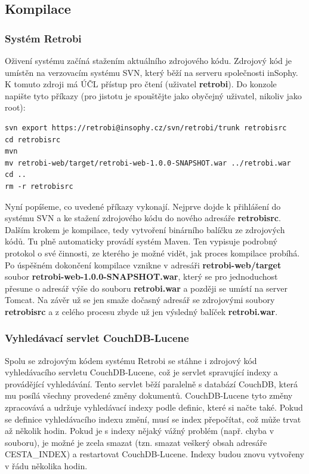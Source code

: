 \subsection{Kompilace}

\subsubsection{Systém Retrobi}

Oživení systému začíná stažením aktuálního zdrojového kódu. Zdrojový kód je umístěn na verzovacím systému SVN, který běží na serveru společnosti inSophy. K tomuto zdroji má ÚČL přístup pro čtení (uživatel {\bf retrobi}).  Do konzole napište tyto příkazy (pro jistotu je spouštějte jako obyčejný uživatel, nikoliv jako root):

\begin{verbatim}
svn export https://retrobi@insophy.cz/svn/retrobi/trunk retrobisrc
cd retrobisrc
mvn
mv retrobi-web/target/retrobi-web-1.0.0-SNAPSHOT.war ../retrobi.war
cd ..
rm -r retrobisrc
\end{verbatim}

Nyní popíšeme, co uvedené příkazy vykonají. Nejprve dojde k přihlášení do systému SVN a ke stažení zdrojového kódu do nového adresáře {\bf retrobisrc}. Dalším krokem je kompilace, tedy vytvoření binárního balíčku ze zdrojových kódů. Tu plně automaticky provádí systém Maven. Ten vypisuje podrobný protokol o své činnosti, ze kterého je možné vidět, jak proces kompilace probíhá. Po úspěšném dokončení kompilace vznikne v adresáři {\bf retrobi-web/target} soubor {\bf retrobi-web-1.0.0-SNAPSHOT.war}, který se pro jednoduchost přesune o adresář výše do souboru {\bf retrobi.war} a později se umístí na server Tomcat. Na závěr už se jen smaže dočasný adresář se zdrojovými soubory {\bf retrobisrc} a z celého procesu zbyde už jen výsledný balíček {\bf retrobi.war}.

\subsubsection{Vyhledávací servlet CouchDB-Lucene}

Spolu se zdrojovým kódem systému Retrobi se stáhne i zdrojový kód vyhledávacího servletu CouchDB-Lucene, což je servlet spravující indexy a provádějící vyhledávání. Tento servlet běží paralelně s databází CouchDB, která mu posílá všechny provedené změny dokumentů. CouchDB-Lucene tyto změny zpracovává a udržuje vyhledávací indexy podle definic, které si načte také. Pokud se definice vyhledávacího indexu změní, musí se index přepočítat, což může trvat až několik hodin. Pokud je s indexy nějaký vážný problém (např. chyba v souboru), je možné je zcela smazat (tzn. smazat veškerý obsah adresáře CESTA\_INDEX) a restartovat CouchDB-Lucene. Indexy budou znovu vytvořeny v řádu několika hodin. 

